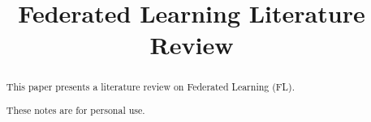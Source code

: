 \documentclass[conference]{IEEEtran}
\begin{document}
\title{Federated Learning Literature Review}


\author{
}

\maketitle

\begin{abstract}
This paper presents a literature review on Federated Learning (FL).

\noindent These notes are for personal use.
\end{abstract}

\begin{IEEEkeywords}

\end{IEEEkeywords}
\end{document}
